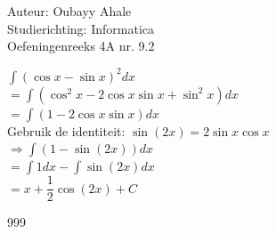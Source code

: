 \documentclass[a4paper]{article}
\newcommand{\dint}{\displaystyle\int}
\begin{document}
  
\noindent \large Auteur: Oubayy Ahale          \\
\noindent \large Studierichting: Informatica   \\
\noindent \large Oefeningenreeks 4A nr. 9.2   \\

\medskip

\normalsize

$\dint (\cos x - \sin x)^2  dx$\\

$= \dint (\cos^2 x - 2 \cos x \sin x + \sin^2 x)  dx$\\

$= \dint (1 - 2 \cos x \sin x) dx$\\

Gebruik de identiteit: $\sin(2x) = 2 \sin x \cos x$\\

$\Rightarrow \dint (1 - \sin(2x)) dx$\\

$= \dint 1 dx - \dint \sin(2x) dx$\\

$= x + \dfrac{1}{2} \cos(2x) + C$\\

\begin{thebibliography}{999}
\end{thebibliography}
\end{document}
